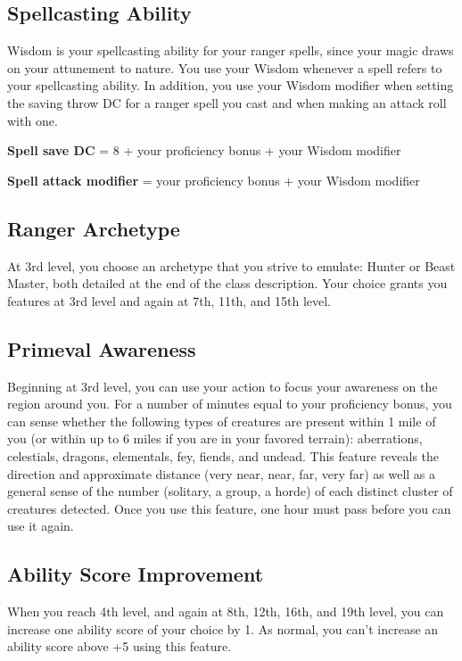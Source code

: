 \subsection{Spellcasting Ability}

Wisdom is your spellcasting ability for your ranger spells, since your magic draws on your attunement to nature. You use your Wisdom whenever a spell refers to your spellcasting ability. In addition, you use your Wisdom modifier when setting the saving throw DC for a ranger spell you cast and when making an attack roll with one.

\textbf{Spell save DC} = 8 + your proficiency bonus + your Wisdom modifier

\textbf{Spell attack modifier} = your proficiency bonus + your Wisdom modifier

\subsection{Ranger Archetype}

At 3rd level, you choose an archetype that you strive to emulate: Hunter or Beast Master, both detailed at the end of the class description. Your choice grants you features at 3rd level and again at 7th, 11th, and 15th level.

\subsection{Primeval Awareness}

Beginning at 3rd level, you can use your action to focus your awareness on the region around you. For a number of minutes equal to your proficiency bonus, you can sense whether the following types of creatures are present within 1 mile of you (or within up to 6 miles if you are in your favored terrain): aberrations, celestials, dragons, elementals, fey, fiends, and undead. This feature reveals the direction and approximate distance (very near, near, far, very far) as well as a general sense of the number (solitary, a group, a horde) of each distinct cluster of creatures detected. Once you use this feature, one hour must pass before you can use it again.

\subsection{Ability Score Improvement}

When you reach 4th level, and again at 8th, 12th, 16th, and 19th level, you can increase one ability score of your choice by 1. As normal, you can't increase an ability score above +5 using this feature.

